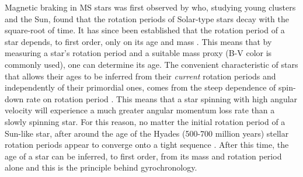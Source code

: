Magnetic braking in MS stars was first observed by \citet{skumanich1972} who,
studying young clusters and the Sun, found that the rotation periods of
Solar-type stars decay with the square-root of time.
It has since been established that the rotation period of a star depends, to
first order, only on its age and mass \citep[\eg][]{barnes2003}.
This means that by measuring a star's rotation period and a suitable mass
proxy (B-V color is commonly used), one can determine its age.
The convenient characteristic of stars that allows their ages to be inferred
from their {\it current} rotation periods and independently of their
primordial ones, comes from the steep dependence of spin-down rate on rotation
period \citep{kawaler1989}.
This means that a star spinning with high angular velocity will experience a
much greater angular momentum loss rate than a slowly spinning star.
For this reason, no matter the initial rotation period of a Sun-like star,
after around the age of the Hyades (500-700 million years) stellar rotation
periods appear to converge onto a tight sequence \citep{irwin2009}.
After this time, the age of a star can be inferred, to first order, from its
mass and rotation period alone and this is the principle behind gyrochronology.


